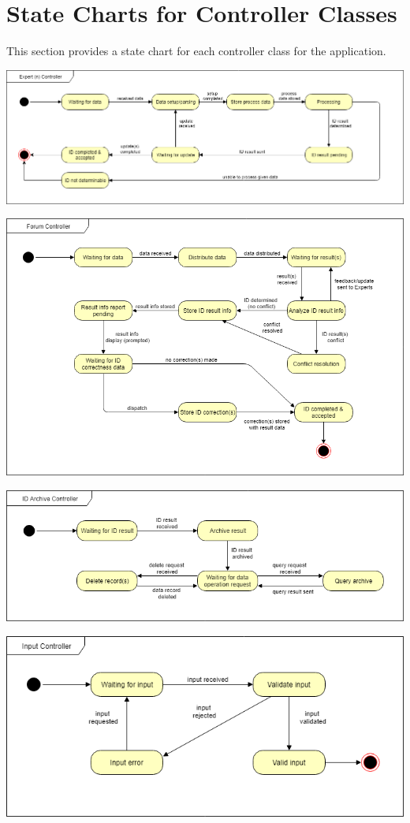 \documentclass[]{article}
\begin{document}
\newpage
\section{State Charts for Controller Classes}
\label{sec:state_charts_for_controller_classes}
This section provides a state chart for each controller class for the application.
\begin{center}
\includegraphics[scale=0.5]{ExpertnController}
\end{center}
\begin{center}
\includegraphics[scale=0.5]{ForumController}
\end{center}
\begin{center}
\includegraphics[scale=0.5]{IDArchiveController}
\end{center}
\begin{center}
\includegraphics[scale=0.5]{InputController}
\end{center}
\end{document}
